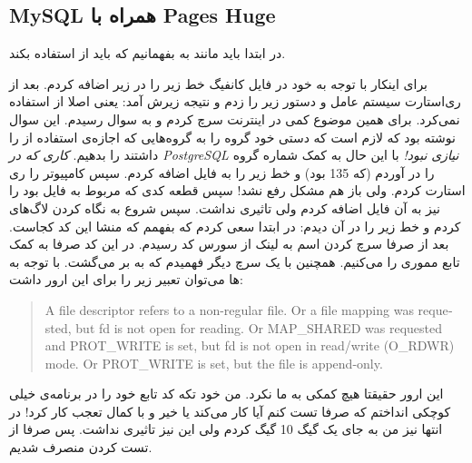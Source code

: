 \subsection{MySQL همراه با Pages Huge}
در ابتدا باید مانند
به
بفهمانیم که باید از
استفاده بکند.

برای اینکار با توجه به
خود
در فایل کانفیگ
خط زیر را در زیر
\codeword{[mysqld]}
اضافه کردم.
بعد از ری‌استارت سیستم عامل و
دستور زیر را زدم و نتیجه زیرش آمد:
یعنی اصلا
 از 
استفاده نمی‌کرد. برای همین موضوع کمی در اینترنت سرچ کردم و به
سوال رسیدم. این سوال نوشته بود که لازم است که دستی خود گروه
را به گروه‌هایی که اجازه‌ی استفاده از
را داشتند را بدهیم.
\emph{کاری که در PostgreSQL نیازی نبود!}
با این حال به کمک
شماره گروه
را در آوردم
(که 135 بود)
و خط زیر را به فایل
اضافه کردم.
سپس کامپیوتر را ری استارت کردم. ولی باز هم مشکل رفع نشد! سپس قطعه کدی که مربوط به فایل
بود را نیز به آن فایل اضافه کردم ولی تاثیری نداشت. سپس شروع به نگاه کردن لاگ‌های
کردم و خط زیر را در آن دیدم:
در ابتدا سعی کردم که بفهمم که منشا این کد کجاست. بعد از صرفا سرچ کردن اسم
به
لینک از سورس کد
رسیدم. در این کد صرفا به کمک تابع
مموری را
می‌کنیم. همچنین با یک سرچ دیگر فهمیدم که
 به 
بر می‌گشت. با توجه به
ها
می‌توان تعبیر زیر را برای این ارور داشت:
\begin{latin}
\begin{quote}
    A file descriptor refers to a non-regular file.  Or a file  mapping  was  requested,  but  fd  is  not  open  for  reading.  Or MAP\_SHARED was requested and PROT\_WRITE is set, but  fd  is  not open in read/write (O\_RDWR) mode.  Or PROT\_WRITE is set, but the file is append-only.
\end{quote}
\end{latin}
این ارور حقیقتا هیچ کمکی به ما نکرد. من خود تکه کد تابع خود
را در برنامه‌ی خیلی کوچکی انداختم که صرفا تست کنم آیا کار می‌کند یا خیر و با کمال تعجب کار کرد!
در انتها نیز من به جای یک گیگ
10 گیگ
کردم ولی این نیز تاثیری نداشت. پس صرفا از تست کردن
منصرف شدیم.